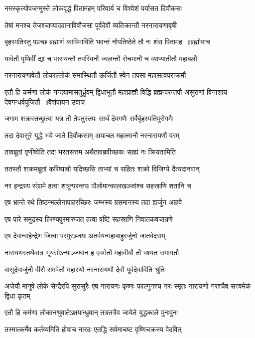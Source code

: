 \twolineshloka
{नमस्कृत्योपजग्मुस्ते लोकवृद्धं पितामहम्}
{परिवार्य च विश्वेशं पर्यासत दिवौकसः}


\twolineshloka
{तेषां मनश्च तेजश्चाप्याददानाविवौजसा}
{पूर्वदेवौ व्यतिक्रान्तौ नरनारायणावृषी}


\threelineshloka
{बृहस्पतिस्तु पप्रच्छ ब्रह्माणं काविमाविति}
{भवन्तं नोपतिष्ठेते तौ नः शंस पितामह ॥ब्रह्मोवाच}
{}


\twolineshloka
{यावेतौ पृथिवीं द्यां च भासयन्तौ तपस्विनौ}
{ज्वलन्तौ रोचमानौ च व्याप्यातीतौ महाबलौ}


\twolineshloka
{नरनारायणावेतौ लोकाल्लोकं समास्थितौ}
{ऊर्जितौ स्वेन तपसा महासत्वपराक्रमौ}


\fourlineindentedshloka
{एतौ हि कर्मणा लोकं नन्दयामासतुर्ध्रुवम्}
{द्विधाभूतौ महाप्राज्ञौ विद्धि ब्रह्मन्परन्तपौ}
{असुराणां विनाशाय देवगन्धर्वपूजितौ ॥वैशंपायन उवाच}
{}


\twolineshloka
{जगाम शक्रस्तच्छ्रत्वा यत्र तौ तेपतुस्तपः}
{सार्धं देवगणैः सर्वैर्बृहस्पतिपुरोगमैः}


\twolineshloka
{तदा देवासुरे युद्धे भये जाते दिवौकसाम्}
{अयाचत महात्मानौ नरनारायणौ वरम्}


\twolineshloka
{तावब्रूतां वृणीष्वेति तदा भरतसत्तम}
{अथैतावब्रवीच्छकः साह्यं नः क्रियतामिति}


\twolineshloka
{ततस्तौ शक्रमब्रूतां करिष्यावो यदिच्छसि}
{ताभ्यां च सहितः शक्रो विजिग्ये दैत्यदानवान्}


\twolineshloka
{नर इन्द्रस्य संग्रामे हत्वा शत्रून्परन्तपः}
{पौलोमान्कालखञ्जांश्च सहस्राणि शतानि च}


\twolineshloka
{एष भ्रान्ते रथे तिष्ठन्भल्लेनापाहरच्छिरः}
{जम्भस्य ग्रसमानस्य तदा ह्यर्जुन आहवे}


\twolineshloka
{एष पारे समुद्रस्य हिरण्यपुरमारुजत्}
{हत्वा षष्टिं सहस्राणि निवातकवचान्रणे}


\twolineshloka
{एष देवान्सहेन्द्रेण जित्वा परपुरञ्जयः}
{अतर्पयन्महाबाहुरर्जुनो जातवेदसम्}


\twolineshloka
{नारायणस्तथैवात्र भूयसोऽन्याञ्जघान ह}
{एवमेतौ महावीर्यौ तौ पश्यत समागतौ}


\twolineshloka
{वासुदेवार्जुनौ वीरौ समवेतौ महारथौ}
{नरनारायणौ देवौ पूर्वदेवाविति श्रुतिः}


\threelineshloka
{अजेयौ मानुषे लोके सेन्द्रैरपि सुरासुरैः}
{एष नारायणः कृष्णः फाल्गुनश्च नरः स्मृतः}
{नारायणो नरश्चैव सत्त्वमेकं द्विधा कृतम्}


\twolineshloka
{एतौ हि कर्मणा लोकानश्रुवातेऽक्षयान्ध्रुवान्}
{तत्रतत्रैव जायेते युद्धकाले पुनःपुनः}


\twolineshloka
{तस्मात्कर्मैव कर्तव्यमिति होवाच नारदः}
{एतद्धि सर्वमाचष्ट वृष्णिचक्रस्य वेदवित्}


